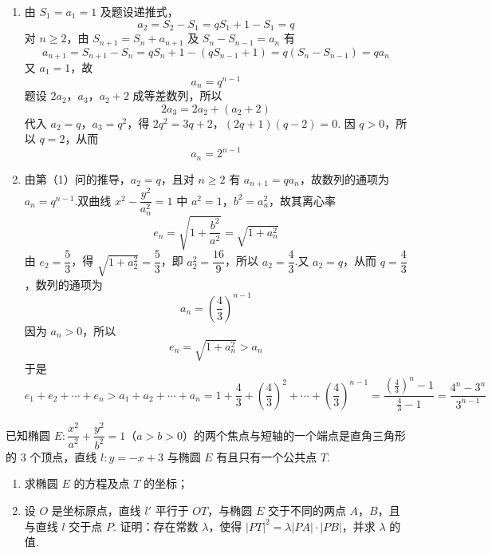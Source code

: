 \begin{solution}
\begin{enumerate}
\item 由 \(S_1=a_1=1\) 及题设递推式，
\[
a_2=S_2-S_1=qS_1+1-S_1=q
\]
对 \(n\geq2\)，由 \(S_{n+1}=S_n+a_{n+1}\) 及 \(S_n-S_{n-1}=a_n\) 有
\[
a_{n+1}=S_{n+1}-S_n
=qS_n+1-(qS_{n-1}+1)
=q(S_n-S_{n-1})=qa_n
\]
又 \(a_1=1\)，故
\[
a_n=q^{n-1}
\]
题设 \(2a_2\)，\(a_3\)，\(a_2+2\) 成等差数列，所以
\[
2a_3=2a_2+(a_2+2)
\]
代入 \(a_2=q\)，\(a_3=q^2\)，得
\(2q^2=3q+2\)，\((2q+1)(q-2)=0\).
因 \(q>0\)，所以 \(q=2\)，从而
\[
a_n=2^{n-1}
\]

\item 由第（1）问的推导，\(a_2=q\)，且对 \(n\ge2\) 有 \(a_{n+1}=qa_n\)，故数列的通项为 \(a_n=q^{n-1}\).双曲线 \(x^2-\dfrac{y^2}{a_n^2}=1\) 中 \(a^2=1\)，\(b^2=a_n^2\)，故其离心率
\[
e_n=\sqrt{1+\frac{b^2}{a^2}}=\sqrt{1+a_n^2}
\]
由 \(e_2=\dfrac53\)，得 \(\sqrt{1+a_2^2}=\dfrac53\)，即 \(a_2^2=\dfrac{16}{9}\)，所以 \(a_2=\dfrac43\).又 \(a_2=q\)，从而 \(q=\dfrac43\)，数列的通项为
\[
a_n=\left(\frac43\right)^{n-1}
\]
因为 \(a_n>0\)，所以
\[
e_n=\sqrt{1+a_n^2}>a_n
\]
于是
\[
e_1+e_2+\cdots+e_n>a_1+a_2+\cdots+a_n
=1+\frac43+\left(\frac43\right)^2+\cdots+\left(\frac43\right)^{n-1}
=\frac{\left(\frac43\right)^n-1}{\frac43-1}
=\frac{4^n-3^n}{3^{n-1}}
\]
\end{enumerate}
\end{solution}


\begin{problem}
已知椭圆 \(E:\dfrac{x^2}{a^2}+\dfrac{y^2}{b^2}=1\)（\(a>b>0\)）的两个焦点与短轴的一个端点是直角三角形的 \(3\) 个顶点，直线 \(l:y=-x+3\) 与椭圆 \(E\) 有且只有一个公共点 \(T\).

\begin{enumerate}
\item 求椭圆 \(E\) 的方程及点 \(T\) 的坐标；
\item 设 \(O\) 是坐标原点，直线 \(l'\) 平行于 \(OT\)，与椭圆 \(E\) 交于不同的两点 \(A\)，\(B\)，且与直线 \(l\) 交于点 \(P\). 证明：存在常数 \(\lambda\)，使得 \(\left|PT\right|^2=\lambda\left|PA\right|\cdot\left|PB\right|\)，并求 \(\lambda\) 的值.
\end{enumerate}
\end{problem}

